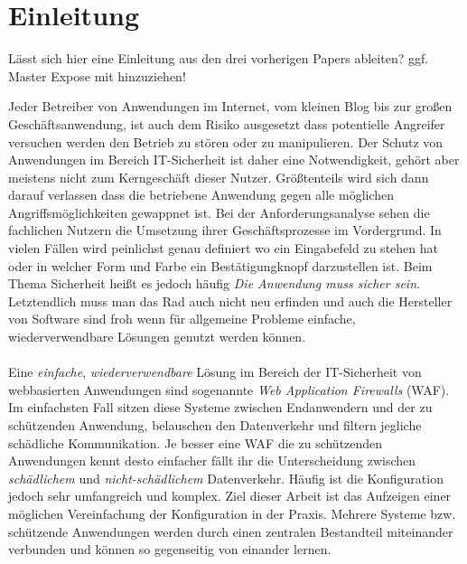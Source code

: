 \chapter{Einleitung}


\begin{neu}
  Lässt sich hier eine Einleitung aus den drei vorherigen Papers ableiten? ggf. Master Expose mit hinzuziehen!
\end{neu}

Jeder Betreiber von Anwendungen im Internet, vom kleinen Blog bis zur großen Geschäftsanwendung, ist auch dem Risiko ausgesetzt dass potentielle Angreifer versuchen werden den Betrieb zu stören oder zu manipulieren. Der Schutz von Anwendungen im Bereich IT-Sicherheit ist daher eine Notwendigkeit, gehört aber meistens nicht zum Kerngeschäft dieser Nutzer. Größtenteils wird sich dann darauf verlassen dass die betriebene Anwendung gegen alle möglichen Angriffsmöglichkeiten gewappnet ist. Bei der Anforderungsanalyse sehen die fachlichen Nutzern die Umsetzung ihrer Geschäftsprozesse im Vordergrund. In vielen Fällen wird peinlichst genau definiert wo ein Eingabefeld zu stehen hat oder in welcher Form und Farbe ein Bestätigungknopf darzustellen ist. Beim Thema Sicherheit heißt es jedoch häufig \glqq\emph{Die Anwendung muss sicher sein.}\grqq \\
Letztendlich muss man das Rad auch nicht neu erfinden und auch die Hersteller von Software sind froh wenn für allgemeine Probleme einfache, wiederverwendbare Lösungen genutzt werden können. \\\\
Eine \emph{einfache}, \emph{wiederverwendbare} Lösung im Bereich der IT-Sicherheit von webbasierten Anwendungen sind sogenannte \emph{Web Application Firewalls} (WAF). Im einfachsten Fall sitzen diese Systeme zwischen Endanwendern und der zu schützenden Anwendung, belauschen den Datenverkehr und filtern jegliche schädliche Kommunikation. Je besser eine WAF die zu schützenden Anwendungen kennt desto einfacher fällt ihr die Unterscheidung zwischen \emph{schädlichem} und \emph{nicht-schädlichem} Datenverkehr. Häufig ist die Konfiguration jedoch sehr umfangreich und komplex. Ziel dieser Arbeit ist das Aufzeigen einer möglichen Vereinfachung der Konfiguration in der Praxis. Mehrere Systeme bzw. schützende Anwendungen werden durch einen zentralen Bestandteil miteinander verbunden und können so gegenseitig von einander lernen.\\\\

